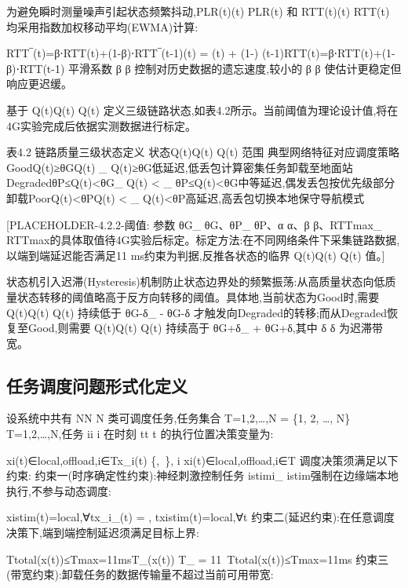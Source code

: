 为避免瞬时测量噪声引起状态频繁抖动,PLR(t)(t)
PLR(t) 和 RTT(t)(t)
RTT(t) 均采用指数加权移动平均(EWMA)计算:

RTT‾(t)=β⋅RTT(t)+(1-β)⋅RTT‾(t-1)(t) = \beta \cdot {}(t) + (1-\beta) \cdot {}(t-1)RTT(t)=β⋅RTT(t)+(1-β)⋅RTT(t-1)
平滑系数 β\beta
β 控制对历史数据的遗忘速度,较小的 β\beta
β 使估计更稳定但响应更迟缓。

基于 Q(t)Q(t)
Q(t) 定义三级链路状态,如表4.2所示。当前阈值为理论设计值,将在4G实验完成后依据实测数据进行标定。

表4.2 链路质量三级状态定义
状态Q(t)Q(t)
Q(t) 范围
典型网络特征对应调度策略GoodQ(t)≥θGQ(t) \geq \theta_{}
Q(t)≥θG​低延迟,低丢包计算密集任务卸载至地面站DegradedθP≤Q(t)<θG\theta_{} \leq Q(t) < \theta_{}
θP​≤Q(t)<θG​中等延迟,偶发丢包按优先级部分卸载PoorQ(t)<θPQ(t) < \theta_{}
Q(t)<θP​高延迟,高丢包切换本地保守导航模式

[PLACEHOLDER-4.2.2-阈值: 参数 θG\theta_{}
θG​、θP\theta_{}
θP​、α\alpha
α、β\beta
β、RTTmax⁡_{\max}
RTTmax的具体取值待4G实验后标定。标定方法:在不同网络条件下采集链路数据,以端到端延迟能否满足11 ms约束为判据,反推各状态的临界 Q(t)Q(t)
Q(t) 值。]


状态机引入迟滞(Hysteresis)机制防止状态边界处的频繁振荡:从高质量状态向低质量状态转移的阈值略高于反方向转移的阈值。具体地,当前状态为Good时,需要 Q(t)Q(t)
Q(t) 持续低于 θG-δ\theta_{} - \delta
θG​-δ 才触发向Degraded的转移;而从Degraded恢复至Good,则需要 Q(t)Q(t)
Q(t) 持续高于 θG+δ\theta_{} + \delta
θG​+δ,其中 δ\delta
δ 为迟滞带宽。

\subsection{任务调度问题形式化定义}

设系统中共有 NN
N 类可调度任务,任务集合 T={1,2,…,N} = \{1, 2, \ldots, N\}
T={1,2,…,N},任务 ii
i 在时刻 tt
t 的执行位置决策变量为:

xi(t)∈{local,offload},i∈Tx_i(t) \in \{,\ \}, \quad i \in {}xi​(t)∈{local,offload},i∈T
调度决策须满足以下约束:
约束一(时序确定性约束):神经刺激控制任务 istimi_{}
istim强制在边缘端本地执行,不参与动态调度:

xistim(t)=local,∀tx_{i_{}}(t) = , \quad \forall txistim​​(t)=local,∀t
约束二(延迟约束):在任意调度决策下,端到端控制延迟须满足目标上界:

Ttotal(x(t))≤Tmax⁡=11msT_{}\bigl(x(t)\bigr) \leq T_{\max} = 11\ Ttotal​(x(t))≤Tmax​=11ms
约束三(带宽约束):卸载任务的数据传输量不超过当前可用带宽:

